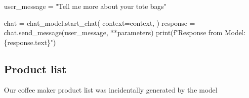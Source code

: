 \documentclass[
  letterpaper,
  DIV=11,
  numbers=noendperiod]{scrreprt}
\newenvironment{Shaded}{\begin{snugshade}}{\end{snugshade}}
\newcommand{\BuiltInTok}[1]{\textcolor[rgb]{0.00,0.23,0.31}{#1}}
\newcommand{\NormalTok}[1]{\textcolor[rgb]{0.00,0.23,0.31}{#1}}
\newcommand{\OperatorTok}[1]{\textcolor[rgb]{0.37,0.37,0.37}{#1}}
\newcommand{\SpecialCharTok}[1]{\textcolor[rgb]{0.37,0.37,0.37}{#1}}
\newcommand{\SpecialStringTok}[1]{\textcolor[rgb]{0.13,0.47,0.30}{#1}}
\newcommand{\StringTok}[1]{\textcolor[rgb]{0.13,0.47,0.30}{#1}}
\begin{document}
\begin{Shaded}
\begin{Highlighting}[]
\NormalTok{user\_message }\OperatorTok{=} \StringTok{"Tell me more about your tote bags"}

\NormalTok{chat }\OperatorTok{=}\NormalTok{ chat\_model.start\_chat(}
\NormalTok{    context}\OperatorTok{=}\NormalTok{context,}
\NormalTok{)}
\NormalTok{response }\OperatorTok{=}\NormalTok{ chat.send\_message(user\_message, }\OperatorTok{**}\NormalTok{parameters)}
\BuiltInTok{print}\NormalTok{(}\SpecialStringTok{f"Response from Model: }\SpecialCharTok{\{}\NormalTok{response}\SpecialCharTok{.}\NormalTok{text}\SpecialCharTok{\}}\SpecialStringTok{"}\NormalTok{)}
\end{Highlighting}
\end{Shaded}

\hypertarget{product-list}{%
\subsection{Product list}\label{product-list}}

Our coffee maker product list was incidentally generated by the model
\end{document}
